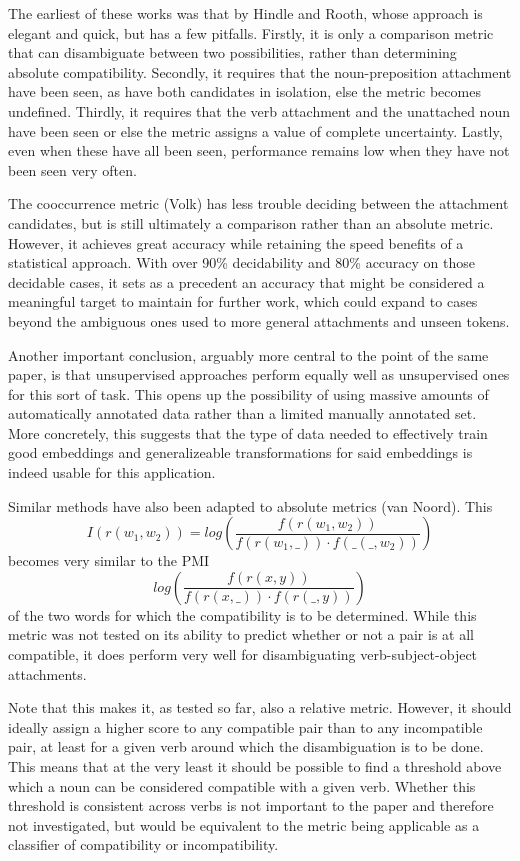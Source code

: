 \documentclass[a4paper, 11pt]{scrartcl}
\begin{document}
The earliest of these works was that by Hindle and Rooth, whose approach is elegant and quick, but has a few pitfalls. Firstly, it is only a comparison metric that can disambiguate between two possibilities, rather than determining absolute compatibility. Secondly, it requires that the noun-preposition attachment have been seen, as have both candidates in isolation, else the metric becomes undefined. Thirdly, it requires that the verb attachment and the unattached noun have been seen or else the metric assigns a value of complete uncertainty. Lastly, even when these have all been seen, performance remains low when they have not been seen very often.

The cooccurrence metric (Volk) has less trouble deciding between the attachment candidates, but is still ultimately a comparison rather than an absolute metric. However, it achieves great accuracy while retaining the speed benefits of a statistical approach. With over 90\% decidability and 80\% accuracy on those decidable cases, it sets as a precedent an accuracy that might be considered a meaningful target to maintain for further work, which could expand to cases beyond the ambiguous ones used to more general attachments and unseen tokens.

Another important conclusion, arguably more central to the point of the same paper, is that unsupervised approaches perform equally well as unsupervised ones for this sort of task. This opens up the possibility of using massive amounts of automatically annotated data rather than a limited manually annotated set. More concretely, this suggests that the type of data needed to effectively train good embeddings and generalizeable transformations for said embeddings is indeed usable for this application.

Similar methods have also been adapted to absolute metrics (van Noord). This $$ I(r(w_1, w_2)) = log(\frac{f(r(w_1, w_2))}{f(r(w_1, \_ )) \cdot f(\_ (\_ , w_2))}) $$ becomes very similar to the PMI $$ log(\frac{f(r(x, y))}{f(r(x, \_ )) \cdot f(r(\_ , y))}) $$ of the two words for which the compatibility is to be determined. While this metric was not tested on its ability to predict whether or not a pair is at all compatible, it does perform very well for disambiguating verb-subject-object attachments.

Note that this makes it, as tested so far, also a relative metric. However, it should ideally assign a higher score to any compatible pair than to any incompatible pair, at least for a given verb around which the disambiguation is to be done. This means that at the very least it should be possible to find a threshold above which a noun can be considered compatible with a given verb. Whether this threshold is consistent across verbs is not important to the paper and therefore not investigated, but would be equivalent to the metric being applicable as a classifier of compatibility or incompatibility.
\end{document}
